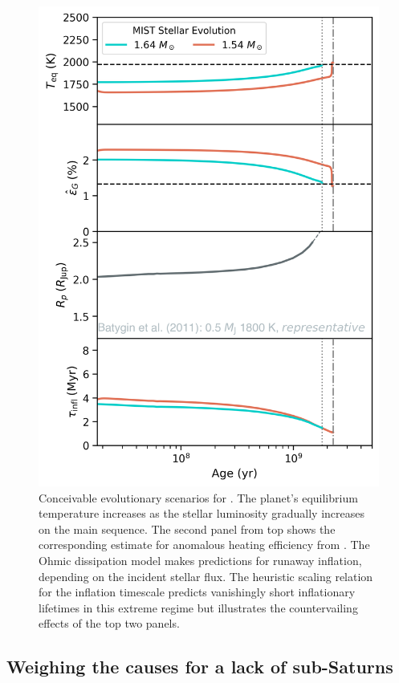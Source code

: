 \documentclass[twocolumn]{aastex631}
\newcommand{\hatpb}{\object{HAT-P-67 b}}
\begin{document}
\begin{figure}
    \includegraphics[width=\linewidth]{figures/reinflation_MIST.png}
    \caption{Conceivable evolutionary scenarios for \hatpb.  The planet's equilibrium temperature increases as the stellar luminosity gradually increases on the main sequence.  The second panel from top shows the corresponding estimate for anomalous heating efficiency from \citet{2018AJ....155..214T}. The Ohmic dissipation model makes predictions for runaway inflation, depending on the incident stellar flux.  The heuristic scaling relation for the inflation timescale predicts vanishingly short inflationary lifetimes in this extreme regime but illustrates the countervailing effects of the top two panels.}
    \label{fig:OhmicInflate}
\end{figure}


\subsection{Weighing the causes for a lack of sub-Saturns}
\end{document}
